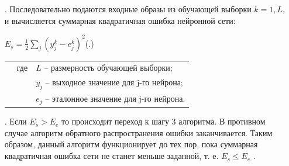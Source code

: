 \begin{itemize}[leftmargin=2.15cm, labelwidth=0.65cm, labelsep=0.0cm]
\begin{itemize}[leftmargin=1.5cm, labelwidth=0.65cm, labelsep=0.0cm]
		\end{itemize}
		
		\addtocounter{itemcntr}{1}
		
		\item[\theitemcntr. ] Последовательно подаются входные образы из обучающей выборки $k = \overline{1,L}$, и вычисляется суммарная квадратичная ошибка нейронной сети:
		
		\formulaspace \par \redline 
		$E_{s} = \frac{1}{2} \sum \limits _{j}^{} (y_{j}^{k} - e_{j}^{k})^{2} $\hfill (\thechaptercntr .\theformulacntr) \redline
		\formulaspace \addtocounter{formulacntr}{1}
		
		\begin{tabular}{p{}p{}p{}}
			& где  & $ L $ {--} размерность обучающей выборки;\\
			&      & $y_{j}$ {--} выходное значение для j-го нейрона;                                                 \\
			&      & $e_{j}$ {--} эталонное значение для j-го нейрона. \\
		\end{tabular}
		
		\addtocounter{itemcntr}{1}
		
		
		\item[\theitemcntr. ] Если $E_s > E_e$ то происходит переход к шагу 3 алгоритма. В противном случае алгоритм обратного распространения ошибки заканчивается. Таким образом, данный алгоритм функционирует до тех пор, пока суммарная квадратичная ошибка сети не станет меньше заданной, т. е. $E_s \leq E_e$ .
		
		\addtocounter{itemcntr}{1}
		
		\setcounter{itemcntr}{1}
	\end{itemize}
	
	
	
